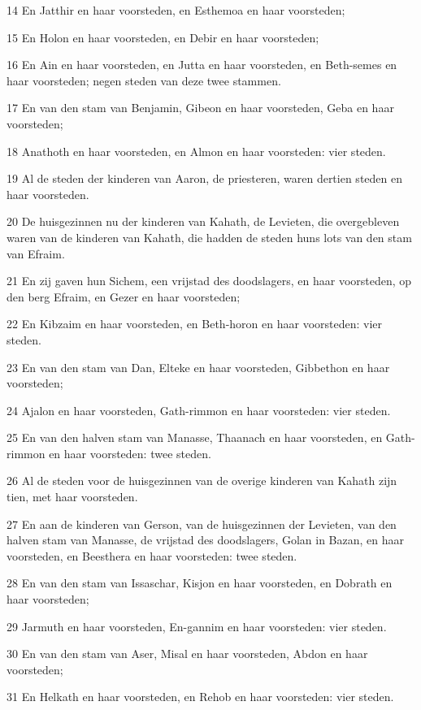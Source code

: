 \par 14 En Jatthir en haar voorsteden, en Esthemoa en haar voorsteden;
\par 15 En Holon en haar voorsteden, en Debir en haar voorsteden;
\par 16 En Ain en haar voorsteden, en Jutta en haar voorsteden, en Beth-semes en haar voorsteden; negen steden van deze twee stammen.
\par 17 En van den stam van Benjamin, Gibeon en haar voorsteden, Geba en haar voorsteden;
\par 18 Anathoth en haar voorsteden, en Almon en haar voorsteden: vier steden.
\par 19 Al de steden der kinderen van Aaron, de priesteren, waren dertien steden en haar voorsteden.
\par 20 De huisgezinnen nu der kinderen van Kahath, de Levieten, die overgebleven waren van de kinderen van Kahath, die hadden de steden huns lots van den stam van Efraim.
\par 21 En zij gaven hun Sichem, een vrijstad des doodslagers, en haar voorsteden, op den berg Efraim, en Gezer en haar voorsteden;
\par 22 En Kibzaim en haar voorsteden, en Beth-horon en haar voorsteden: vier steden.
\par 23 En van den stam van Dan, Elteke en haar voorsteden, Gibbethon en haar voorsteden;
\par 24 Ajalon en haar voorsteden, Gath-rimmon en haar voorsteden: vier steden.
\par 25 En van den halven stam van Manasse, Thaanach en haar voorsteden, en Gath-rimmon en haar voorsteden: twee steden.
\par 26 Al de steden voor de huisgezinnen van de overige kinderen van Kahath zijn tien, met haar voorsteden.
\par 27 En aan de kinderen van Gerson, van de huisgezinnen der Levieten, van den halven stam van Manasse, de vrijstad des doodslagers, Golan in Bazan, en haar voorsteden, en Beesthera en haar voorsteden: twee steden.
\par 28 En van den stam van Issaschar, Kisjon en haar voorsteden, en Dobrath en haar voorsteden;
\par 29 Jarmuth en haar voorsteden, En-gannim en haar voorsteden: vier steden.
\par 30 En van den stam van Aser, Misal en haar voorsteden, Abdon en haar voorsteden;
\par 31 En Helkath en haar voorsteden, en Rehob en haar voorsteden: vier steden.
